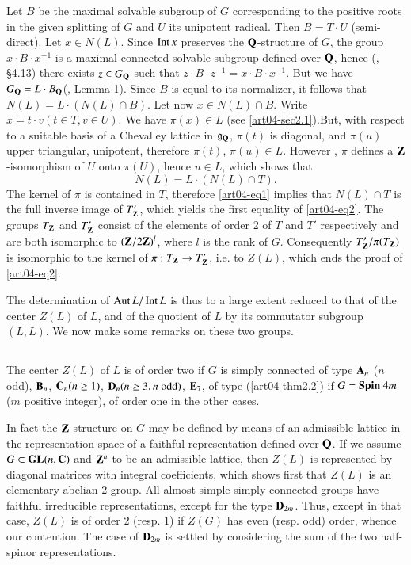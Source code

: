 Let $B$ be the maximal solvable subgroup of $G$ corresponding to the positive roots in the given splitting of $G$ and $U$ its unipotent radical. Then $B=T\cdot U$ (semi-direct). Let $x\in N(L)$. Since $\operatorname{\mathrm{Int}} x$ preserves the $\mathbf{Q}$-structure of $G$, the group $x\cdot B\cdot x^{-1}$ is a maximal connected solvable subgroup defined over $\mathbf{Q}$, hence (\cite{art04-key9}, \S4.13) there exists $z\in G_{\mathbf{Q}}$ such that $z\cdot B\cdot z^{-1}=x\cdot B\cdot x^{-1}$. But we have $G_{\mathbf{Q}}=L\cdot B_{\mathbf{Q}}$(\cite{art04-key6}, Lemma 1). Since $B$ is equal to its normalizer, it follows that $N(L)=L\cdot (N(L)\cap B)$. Let now $x\in N(L)\cap B$. Write $x=t\cdot v(t\in T,v\in U)$. We have $\pi(x)\in L$ (see \ref{art04-sec2.1}).\pageoriginale But, with respect to a suitable basis of a Chevalley lattice in $\mathfrak{g}_{\mathbf{Q}}$, $\pi(t)$ is diagonal, and $\pi(u)$ upper triangular, unipotent, therefore $\pi(t)$, $\pi(u)\in L$. However \cite{art04-key10}, $\pi$ defines a $\mathbf{Z}$-isomorphism of $U$ onto $\pi(U)$, hence $u\in L$, which shows that
\begin{equation}
N(L)=L\cdot (N(L)\cap T).\label{art04-eq3}
\end{equation}
The kernel of $\pi$ is contained in $T$, therefore \eqref{art04-eq1} implies that $N(L)\cap T$ is the full inverse image of $T'_{\mathbf{Z}}$, which yields the first equality of \eqref{art04-eq2}. The groups $T_{\mathbf{Z}}$ and $T'_{\mathbf{Z}}$ consist of the elements of order 2 of $T$ and $T'$ respectively and are both isomorphic to $(\mathbf{Z}/2\mathbf{Z})^{l}$, where $l$ is the rank of $G$. Consequently $T'_{\mathbf{Z}}/\pi(T_{\mathbf{Z}})$ is isomorphic to the kernel of $\pi:T_{\mathbf{Z}}\to T'_{\mathbf{Z}}$, i.e. to $Z(L)$, which ends the proof of \eqref{art04-eq2}.

The determination of $\operatorname{\mathrm{Aut}} L/\operatorname{\mathrm{Int}} L$ is thus to a large extent reduced to that of the center $Z(L)$ of $L$, and of the quotient of $L$ by its commutator subgroup $(L,L)$. We now make some remarks on these two groups.

\setcounter{subsection}{3}
\subsection{}\label{art04-sec2.4}
The center $Z(L)$ of $L$ is of order two if $G$ is simply connected of type $\mathbf{A}_{n}$ ($n$ odd), $\mathbf{B}_{n}$, $\mathbf{C}_{n}(n\geq 1)$, $\mathbf{D}_{n}(n\geq 3, n\text{~odd})$, $\mathbf{E}_{7}$, of type (\ref{art04-thm2.2}) if $G={\boldmath\text{$\operatorname{\mathrm{Spin}}$~}} 4m$ ($m$ positive integer), of order one in the other cases.

In fact the $\mathbf{Z}$-structure on $G$ may be defined by means of an admissible lattice in the representation space of a faithful representation defined over $\mathbf{Q}$. If we assume $G\subset \mathbf{GL}(n,\mathbf{C})$ and $\mathbf{Z}^{n}$ to be an admissible lattice, then $Z(L)$ is represented by diagonal matrices with integral coefficients, which shows first that $Z(L)$ is an elementary abelian 2-group. All almost simple simply connected groups have faithful irreducible representations, except for the type $\mathbf{D}_{2m}$. Thus, except in that case, $Z(L)$ is of order 2 (resp. 1) if $Z(G)$ has even (resp. odd) order, whence our contention. The case of $\mathbf{D}_{2m}$ is settled by considering the sum of the two half-spinor representations.

